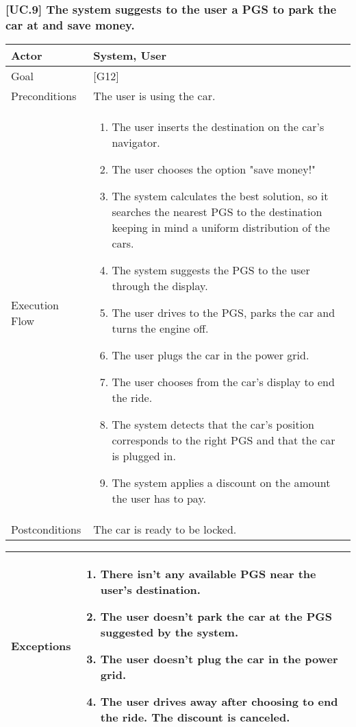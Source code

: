 \documentclass[english]{article}
\begin{document}
		\subsubsection{[UC.9] The system suggests to the user a PGS to park the car at and save money.}
			\begin{tabularx}{\textwidth}{  l  X  }
				\hline
				Actor & System, User\\
				\hline
				Goal & [G12]\\
				\hline
				Preconditions & The user is using the car.\\
				\hline
				Execution Flow & \begin{enumerate}
					\item{The user inserts the destination on the car's navigator.}
					\item{The user chooses the option "save money!"}
					\item{The system calculates the best solution, so it searches the nearest PGS to the destination keeping in mind a uniform distribution of the cars.}
					\item{The system suggests the PGS to the user through the display.}
					\item{The user drives to the PGS, parks the car and turns the engine off.}
					\item{The user plugs the car in the power grid.}
					\item{The user chooses from the car's display to end the ride.}
					\item{The system detects that the car's position corresponds to the right PGS and that the car is plugged in.}
					\item{The system applies a discount on the amount the user has to pay.}
				\end{enumerate}\\
				\hline
				Postconditions & The car is ready to be locked.\\
				\hline
			\end{tabularx}
			\begin{tabularx}{\textwidth}{ l X }
				Exceptions & \begin{enumerate}
					\item{There isn't any available PGS near the user's destination.}
					\item{The user doesn't park the car at the PGS suggested by the system.}
					\item{The user doesn't plug the car in the power grid.}
					\item{The user drives away after choosing to end the ride. The discount is canceled.}
				\end{enumerate}\\
				\hline
			\end{tabularx}
			
\end{document}
